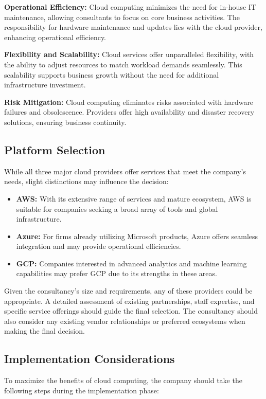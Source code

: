 \documentclass{article}
\begin{document}
\textbf{Operational Efficiency:} Cloud computing minimizes the need for in-house IT maintenance, allowing consultants to focus on core business activities. The responsibility for hardware maintenance and updates lies with the cloud provider, enhancing operational efficiency.

\textbf{Flexibility and Scalability:} Cloud services offer unparalleled flexibility, with the ability to adjust resources to match workload demands seamlessly. This scalability supports business growth without the need for additional infrastructure investment.

\textbf{Risk Mitigation:} Cloud computing eliminates risks associated with hardware failures and obsolescence. Providers offer high availability and disaster recovery solutions, ensuring business continuity.

\subsection{Platform Selection}
While all three major cloud providers offer services that meet the company's needs, slight distinctions may influence the decision:
\begin{itemize}
    \item \textbf{AWS:} With its extensive range of services and mature ecosystem, AWS is suitable for companies seeking a broad array of tools and global infrastructure.
    \item \textbf{Azure:} For firms already utilizing Microsoft products, Azure offers seamless integration and may provide operational efficiencies.
    \item \textbf{GCP:} Companies interested in advanced analytics and machine learning capabilities may prefer GCP due to its strengths in these areas.
\end{itemize}
Given the consultancy's size and requirements, any of these providers could be appropriate. A detailed assessment of existing partnerships, staff expertise, and specific service offerings should guide the final selection. The consultancy should also consider any existing vendor relationships or preferred ecosystems when making the final decision.

\subsection{Implementation Considerations}
To maximize the benefits of cloud computing, the company should take the following steps during the implementation phase:
\end{document}
